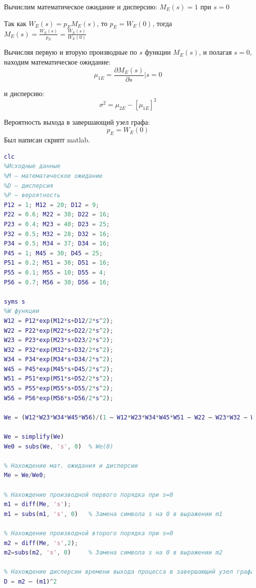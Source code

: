 Вычислим математическое ожидание и дисперсию: $M_E(s) = 1$ при $s=0$

Так как $W_E(s)=p_E M_E (s)$,  то  $p_E=W_E(0)$, тогда $M_E(s)=\frac{W_E(s)}{p_E} =\frac{W_E(s)}{W_E(0)}$

Вычисляя первую и вторую производные по $s$ функции $M_E(s)$, и полагая $s=0$, находим математическое ожидание:
\begin{equation*}
\mu_{1E}=\frac{\partial M_E(s)}{\partial s}|s=0
\end{equation*}

и дисперсию:
\begin{equation*}
\sigma^2=\mu_{2E}-[\mu_{1E}]^2
\end{equation*}

Вероятность выхода в завершающий узел графа:
\begin{equation*}
p_E=W_E (0)
\end{equation*}
Был написан скрипт matlab.
\begin{lstlisting}[language={matlab}, caption={Код Matlab}]
clc
%Исходные данные
%М — математическое ожидание
%D — дисперсия
%P — вероятность
P12 = 1; M12 = 20; D12 = 9; 
P22 = 0.6; M22 = 30; D22 = 16; 
P23 = 0.4; M23 = 40; D23 = 25; 
P32 = 0.5; M32 = 28; D32 = 16; 
P34 = 0.5; M34 = 37; D34 = 16; 
P45 = 1; M45 = 30; D45 = 25; 
P51 = 0.2; M51 = 30; D51 = 16; 
P55 = 0.1; M55 = 10; D55 = 4; 
P56 = 0.7; M56 = 30; D56 = 16; 
 
syms s
%W функции
W12 = P12*exp(M12*s+D12/2*s^2);
W22 = P22*exp(M22*s+D22/2*s^2);
W23 = P23*exp(M23*s+D23/2*s^2);
W32 = P32*exp(M32*s+D32/2*s^2);
W34 = P34*exp(M34*s+D34/2*s^2);
W45 = P45*exp(M45*s+D45/2*s^2);
W51 = P51*exp(M51*s+D52/2*s^2);
W55 = P55*exp(M55*s+D55/2*s^2);
W56 = P56*exp(M56*s+D56/2*s^2);
 
We = (W12*W23*W34*W45*W56)/(1 — W12*W23*W34*W45*W51 — W22 — W23*W32 — W55+W22*W55+W55*W23*W32);
 
We = simplify(We)
We0 = subs(We, 's', 0)  % We(0)
 
% Нахождение мат. ожидания и дисперсии
Me = We/We0;
 
% Нахождение производной первого порядка при s=0
m1 = diff(Me, 's');     
m1 = subs(m1, 's', 0)   % Замена символа s на 0 в выражении m1
 
% Нахождение производной второго порядка при s=0
m2 = diff(Me, 's',2);
m2=subs(m2, 's', 0)     % Замена символа s на 0 в выражении m2
 
% Нахождение дисперсии времени выхода процесса в завершающий узел графа
D = m2 — (m1)^2
\end{lstlisting}
